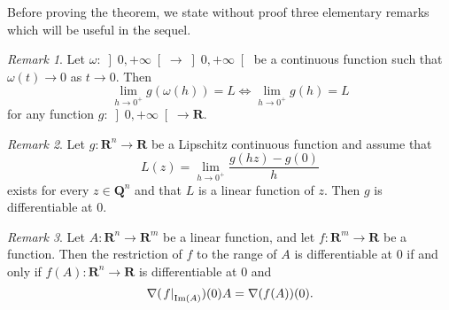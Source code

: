 \documentclass{article}
\theoremstyle{definition}
\theoremstyle{remark}
\newtheorem{rem}{Remark}[section]
\DeclareMathOperator{\IM}{Im}
\newcommand{\eval}[2][\right]{\relax
  \ifx#1\right\relax \left.\fi#2#1\rvert}
\begin{document}
Before proving the theorem, we state without proof three elementary
remarks which will be useful in the sequel.
\begin{rem}\label{r:omb}
Let $\omega\colon \left]0,+\infty\right[\to \left]0,+\infty\right[$
be a continuous function such that $\omega (t)\to 0$ as $t\to
0$. Then
\[\lim_{h\to 0^+}g(\omega(h))=L\Leftrightarrow\lim_{h\to
0^+}g(h)=L\]
for any function $g\colon \left]0,+\infty\right[\to \symbf{R}$.
\end{rem}
\begin{rem}\label{r:dif}
Let $g \colon  \symbf{R}^n\to \symbf{R}$ be a Lipschitz
continuous function and assume that
\[L(z)=\lim_{h\to 0^+}\frac{g(hz)-g(0)}h\]
exists for every $z\in\symbf{Q}^n$ and that $L$ is a linear function of
$z$. Then $g$ is differentiable at 0.
\end{rem}
\begin{rem}\label{r:dif0}
Let $A \colon \symbf{R}^n\to \symbf{R}^m$ be a linear function, and
let $f \colon \symbf{R}^m\to \symbf{R}$ be a function. Then the
restriction of $f$ to the range of $A$ is differentiable at 0 if and
only if $f(A)\colon \symbf{R}^n\to \symbf{R}$ is differentiable at 0
and
\[\nabla(\eval{f}_{\IM(A)})(0)A=\nabla (f(A))(0).\]
\end{rem}
\end{document}

